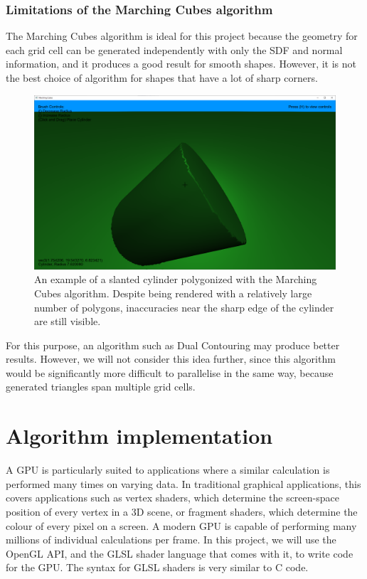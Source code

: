 \documentclass{article}
\begin{document}
\subsubsection{Limitations of the Marching Cubes algorithm}
The Marching Cubes algorithm is ideal for this project because the geometry for each grid cell can be generated independently with only the SDF and normal information, and it produces a good result for smooth shapes. However, it is not the best choice of algorithm for shapes that have a lot of sharp corners.
\begin{figure}[H]
  \includegraphics[width=\textwidth]{mc_cylinder.png}
  \caption{An example of a slanted cylinder polygonized with the Marching Cubes algorithm. Despite being rendered with a relatively large number of polygons, inaccuracies near the sharp edge of the cylinder are still visible.}
\end{figure}
For this purpose, an algorithm such as Dual Contouring\cite{10.1145/566654.566586} may produce better results. However, we will not consider this idea further, since this algorithm would be significantly more difficult to parallelise in the same way, because generated triangles span multiple grid cells.

\section{Algorithm implementation}
A GPU is particularly suited to applications where a similar calculation is performed many times on varying data. In traditional graphical applications, this covers applications such as vertex shaders, which determine the screen-space position of every vertex in a 3D scene, or fragment shaders, which determine the colour of every pixel on a screen. A modern GPU is capable of performing many millions of individual calculations per frame. In this project, we will use the OpenGL API, and the GLSL shader language that comes with it, to write code for the GPU. The syntax for GLSL shaders is very similar to C code. 
\end{document}
